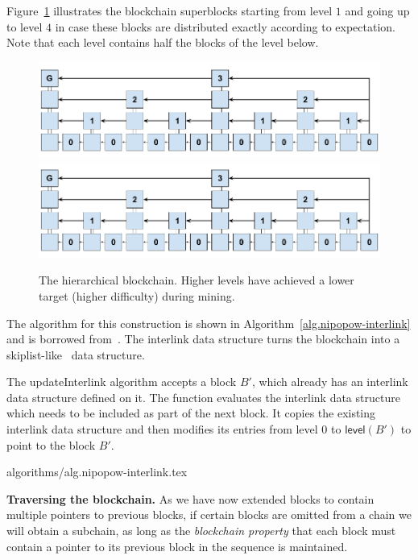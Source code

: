 Figure~\ref{fig.hierarchy} illustrates the blockchain superblocks starting from
level $1$ and going up to level $4$ in case these blocks are distributed
exactly according to expectation. Note that each level contains half the blocks
of the level below.

\begin{figure}
    \caption{The hierarchical blockchain.
    Higher levels have achieved a lower target (higher difficulty) during mining.}
    \centering
    \iftwocolumn
        \includegraphics[width=0.9\columnwidth,keepaspectratio]{figures/hierarchical-ledger.png}
    \else
        \includegraphics[width=0.7\columnwidth,keepaspectratio]{figures/hierarchical-ledger.png}
    \fi
    \label{fig.hierarchy}
\end{figure}

The algorithm for this construction is shown in
Algorithm~\ref{alg.nipopow-interlink} and is borrowed from~\cite{KLS}. The
interlink data structure turns the blockchain into a
skiplist-like~\cite{skiplist} data structure.

The updateInterlink algorithm accepts a block $B'$, which already has an
interlink data structure defined on it. The function evaluates the
interlink data structure which needs to be included as part of the next block.
It copies the existing interlink data structure and
then modifies its entries from level $0$ to $\textsf{level}(B')$ to
point to the block $B'$.

{algorithms/alg.nipopow-interlink.tex}

\noindent\textbf{Traversing the blockchain. }
As we have now extended blocks to contain multiple pointers to previous blocks,
if certain blocks are omitted from a chain we will obtain a subchain, as long as
the \emph{blockchain property} that each block must contain a pointer to its
previous block in the sequence is maintained.

